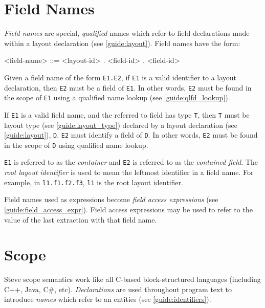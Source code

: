 \section{Field Names} \label{guide:field_name}

\textit{Field names} are special, \textit{qualified} names which refer to field declarations made within a layout declaration (see \ref{guide:layout}). Field names have the form:

\begin{minip}
\begin{grammar}
<field-name> ::=
<layout-id> \textit{.} <field-id>
 \textit{.} <field-id>
\end{grammar}
\end{minip}

Given a field name of the form \texttt{E1.E2}, if \texttt{E1} is a valid identifier to a layout declaration, then \texttt{E2} must be a field of \texttt{E1}. In other words, \texttt{E2} must be found in the scope of \texttt{E1} using a qualified name lookup (see \ref{guide:qlfd_lookup}).

If \texttt{E1} is a valid field name, and the referred to field has type \texttt{T}, then \texttt{T} must be layout type (see \ref{guide:layout_type}) declared by a layout declaration (see \ref{guide:layout}), \texttt{D}. \texttt{E2} must identify a field of \texttt{D}.  In other words, \texttt{E2} must be found in the scope of \texttt{D} using qualified name lookup.

\texttt{E1} is referred to as the \textit{container} and \texttt{E2} is referred to as the \textit{contained field}. The \textit{root layout identifier} is used to mean the leftmost identifier in a field name. For example, in \texttt{l1.f1.f2.f3}, \texttt{l1} is the root layout identifier.

Field names used as expressions become \textit{field access expressions} (see \ref{guide:field_access_expr}). Field access expressions may be used to refer to the value of the last extraction with that field name.

\section{Scope} \label{guide:scope}

Steve scope semantics work like all C-based block-structured languages (including C++, Java, C\#, etc). 
\textit{Declarations} are used throughout program text to introduce \textit{names} which refer to an entities (see \ref{guide:identifiers}). 

